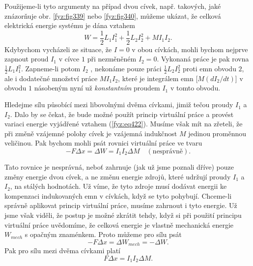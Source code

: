   Použijeme-li tyto argumenty na případ dvou cívek, např. takových, jaké znázorňuje obr. 
  \ref{fyz:fig339} nebo \ref{fyz:fig340}, můžeme ukázat, že celková elektrická energie systému je 
  dána vztahem
  \begin{equation}\label{fyz:eq422}
    W = \frac{1}{2}L_1I_1^2 + \frac{1}{2}L_2I_2^2 + MI_1I_2.
  \end{equation}
  Kdybychom vycházeli ze situace, že \(I = 0\) v obou cívkách, mohli bychom nejprve zapnout proud 
  \(I_1\) v cívce \(1\) při nezměněném \(I_2 = 0\). Vykonaná práce je pak rovna 
  \(\frac{1}{2}L_1I_1^2\). Zapneme-li potom \(I_2\) , nekonáme pouze práci \(\frac{1}{2}L_2I_2^2\) 
  proti emn obvodu \(2\), ale i dodatečné množství práce \(MI_1I_2\), které je integrálem emn 
  [\(M(dI_2/dt)\)] v obvodu \(1\) násobeným nyní už \emph{konstantním} proudem \(I_1\) v tomto 
  obvodu.
  
  Hledejme sílu působící mezi libovolnými dvěma cívkami, jimiž tečou proudy \(I_1\) a \(I_2\). Dalo 
  by se čekat, že bude možné použít princip virtuální práce a provést variaci energie vyjádřené 
  vztahem (\ref{fyz:eq422}). Musíme však mít na zřeteli, že při změně vzájemné polohy cívek je 
  vzájemná indukčnost \(M\) jedinou proměnnou veličinou. Pak bychom mohli psát rovnici virtuální 
  práce ve tvaru
  \begin{equation}\label{fyz:eq423}
    -F\Delta x = \Delta W = I_1I_2\Delta M \quad (\text{nesprávně}).
  \end{equation}

  Tato rovnice je nesprávná, neboť zahrnuje (jak už jsme poznali dříve) pouze změny energie dvou 
  cívek, a ne změnu energie zdrojů, které udržují proudy \(I_1\) a \(I_2\), na stálých hodnotách. 
  Už víme, že tyto zdroje musí dodávat energii ke kompenzaci indukovaných emn v cívkách, když se 
  tyto pohybují. Chceme-li správně aplikovat princip virtuální práce, musíme zahrnout i tyto 
  energie. Už jsme však viděli, že postup je možné zkrátit tehdy, když si při použití principu 
  virtuální práce uvědomíme, že celková energie je vlastně mechanická energie \(W_{mech}\) s 
  opačným znaménkem. Proto můžeme pro sílu psát
  \begin{equation}\label{fyz:eq424}
    -F\Delta x = \Delta W_{mech} = -\Delta W.
  \end{equation}
  Pak pro sílu mezi dvěma cívkami platí
  \begin{equation*}
    F\Delta x = I_1I_2\Delta M.
  \end{equation*}
  
